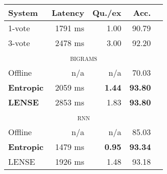 \begin{tabular}[b]{l  r  r  r  r}
    \textbf{System} & \textbf{Latency} & \textbf{Qu./ex} & \textbf{Acc.} \\ \hline
    1-vote & 1791 ms & 1.00 & 90.79 \\ %
    3-vote & 2478 ms & 3.00 & 92.20 \\ %
    \multicolumn{5}{c}{\textsc{bigrams}} \\ \hline
    Offline & n/a & n/a & 70.03 \\ %
    \textbf{Entropic} & 2059 ms & \textbf{1.44} & \textbf{93.80} \\ %
    \textbf{LENSE} & 2853 ms & 1.83 & \textbf{93.80} \\%
    \multicolumn{5}{c}{\textsc{rnn}} \\ \hline
    Offline & n/a & n/a & 85.03 \\ %
    \textbf{Entropic} & 1479 ms & \textbf{0.95} & \textbf{93.34} \\ %
    LENSE & 1926 ms & 1.48 & 93.18 \\ %
\end{tabular}
